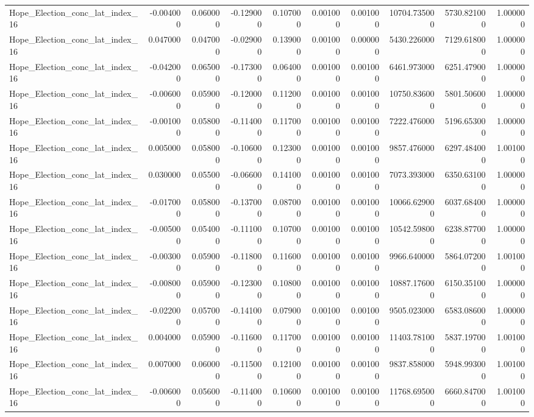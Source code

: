 \begin{table}
\begin{tabular}{lrrrrrrrrr}
Hope_Election_conc_lat_index_16 & -0.004000 & 0.060000 & -0.129000 & 0.107000 & 0.001000 & 0.001000 & 10704.735000 & 5730.821000 & 1.000000 \\
Hope_Election_conc_lat_index_16 & 0.047000 & 0.047000 & -0.029000 & 0.139000 & 0.001000 & 0.000000 & 5430.226000 & 7129.618000 & 1.000000 \\
Hope_Election_conc_lat_index_16 & -0.042000 & 0.065000 & -0.173000 & 0.064000 & 0.001000 & 0.001000 & 6461.973000 & 6251.479000 & 1.000000 \\
Hope_Election_conc_lat_index_16 & -0.006000 & 0.059000 & -0.120000 & 0.112000 & 0.001000 & 0.001000 & 10750.836000 & 5801.506000 & 1.000000 \\
Hope_Election_conc_lat_index_16 & -0.001000 & 0.058000 & -0.114000 & 0.117000 & 0.001000 & 0.001000 & 7222.476000 & 5196.653000 & 1.000000 \\
Hope_Election_conc_lat_index_16 & 0.005000 & 0.058000 & -0.106000 & 0.123000 & 0.001000 & 0.001000 & 9857.476000 & 6297.484000 & 1.001000 \\
Hope_Election_conc_lat_index_16 & 0.030000 & 0.055000 & -0.066000 & 0.141000 & 0.001000 & 0.001000 & 7073.393000 & 6350.631000 & 1.000000 \\
Hope_Election_conc_lat_index_16 & -0.017000 & 0.058000 & -0.137000 & 0.087000 & 0.001000 & 0.001000 & 10066.629000 & 6037.684000 & 1.000000 \\
Hope_Election_conc_lat_index_16 & -0.005000 & 0.054000 & -0.111000 & 0.107000 & 0.001000 & 0.001000 & 10542.598000 & 6238.877000 & 1.000000 \\
Hope_Election_conc_lat_index_16 & -0.003000 & 0.059000 & -0.118000 & 0.116000 & 0.001000 & 0.001000 & 9966.640000 & 5864.072000 & 1.001000 \\
Hope_Election_conc_lat_index_16 & -0.008000 & 0.059000 & -0.123000 & 0.108000 & 0.001000 & 0.001000 & 10887.176000 & 6150.351000 & 1.000000 \\
Hope_Election_conc_lat_index_16 & -0.022000 & 0.057000 & -0.141000 & 0.079000 & 0.001000 & 0.001000 & 9505.023000 & 6583.086000 & 1.000000 \\
Hope_Election_conc_lat_index_16 & 0.004000 & 0.059000 & -0.116000 & 0.117000 & 0.001000 & 0.001000 & 11403.781000 & 5837.197000 & 1.001000 \\
Hope_Election_conc_lat_index_16 & 0.007000 & 0.060000 & -0.115000 & 0.121000 & 0.001000 & 0.001000 & 9837.858000 & 5948.993000 & 1.001000 \\
Hope_Election_conc_lat_index_16 & -0.006000 & 0.056000 & -0.114000 & 0.106000 & 0.001000 & 0.001000 & 11768.695000 & 6660.847000 & 1.001000 \\

\end{tabular}
\end{table}
